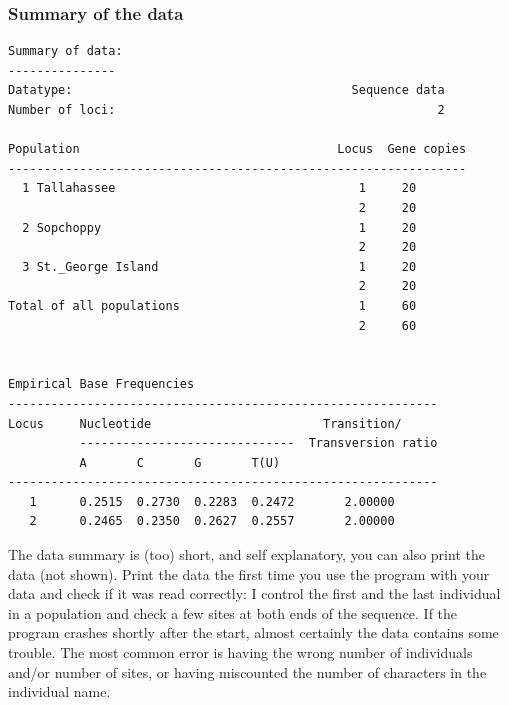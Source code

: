 \subsubsection{Summary of the data}
\begin{center}
\begin{boxedminipage}{6in}
\begin{small}
\begin{tt}
\begin{verbatim}
Summary of data:
---------------
Datatype:                                       Sequence data
Number of loci:                                             2

Population                                    Locus  Gene copies
----------------------------------------------------------------
  1 Tallahassee                                  1     20
                                                 2     20
  2 Sopchoppy                                    1     20
                                                 2     20
  3 St._George Island                            1     20
                                                 2     20
Total of all populations                         1     60
                                                 2     60


Empirical Base Frequencies
------------------------------------------------------------
Locus     Nucleotide                        Transition/
          ------------------------------  Transversion ratio
          A       C       G       T(U)
------------------------------------------------------------
   1      0.2515  0.2730  0.2283  0.2472       2.00000
   2      0.2465  0.2350  0.2627  0.2557       2.00000

\end{verbatim}
\end{tt}
\end{small}
\end{boxedminipage}
\end{center}
The data summary is (too) short, and self explanatory, you can also print
the data (not shown). Print the data the first time you use the program with
your data and check if it was read correctly: I control the first and the last
individual in a population and check a few sites at both ends of the sequence.
If the program crashes shortly after the start, almost certainly the data
contains some trouble. The most common error is having the wrong number
of individuals and/or number of sites, or having miscounted the number of characters in the individual name.
\newpage
